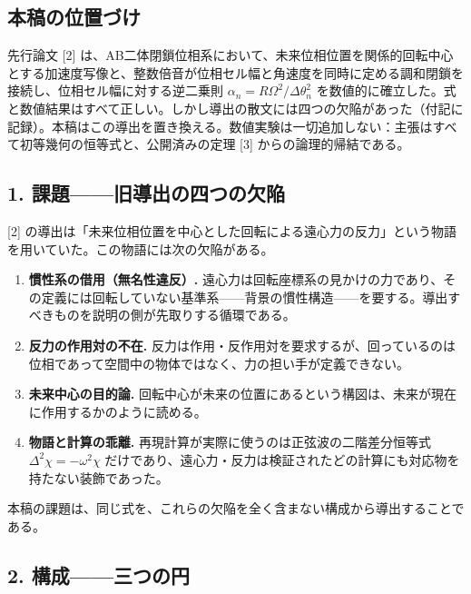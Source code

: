 \documentclass[
  a4paper,
]{ltjsarticle}
\providecommand{\tightlist}{%
  \setlength{\itemsep}{0pt}\setlength{\parskip}{0pt}}
\begin{document}
\subsection{本稿の位置づけ}\label{ux672cux7a3fux306eux4f4dux7f6eux3065ux3051}

先行論文 {[}2{]}
は、AB二体閉鎖位相系において、未来位相位置を関係的回転中心とする加速度写像と、整数倍音が位相セル幅と角速度を同時に定める調和閉鎖を接続し、位相セル幅に対する逆二乗則
\(\alpha_n=R\Omega^2/\Delta\theta_n^2\)
を数値的に確立した。式と数値結果はすべて正しい。しかし導出の散文には四つの欠陥があった（付記に記録）。本稿はこの導出を置き換える。数値実験は一切追加しない：主張はすべて初等幾何の恒等式と、公開済みの定理
{[}3{]} からの論理的帰結である。

\subsection{1.
課題------旧導出の四つの欠陥}\label{ux8ab2ux984cux65e7ux5c0eux51faux306eux56dbux3064ux306eux6b20ux9665}

{[}2{]}
の導出は「未来位相位置を中心とした回転による遠心力の反力」という物語を用いていた。この物語には次の欠陥がある。

\begin{enumerate}
\def\labelenumi{\arabic{enumi}.}
\tightlist
\item
  \textbf{慣性系の借用（無名性違反）.}
  遠心力は回転座標系の見かけの力であり、その定義には回転していない基準系------背景の慣性構造------を要する。導出すべきものを説明の側が先取りする循環である。
\item
  \textbf{反力の作用対の不在.}
  反力は作用・反作用対を要求するが、回っているのは位相であって空間中の物体ではなく、力の担い手が定義できない。
\item
  \textbf{未来中心の目的論.}
  回転中心が未来の位置にあるという構図は、未来が現在に作用するかのように読める。
\item
  \textbf{物語と計算の乖離.}
  再現計算が実際に使うのは正弦波の二階差分恒等式
  \(\Delta^2\chi=-\omega^2\chi\)
  だけであり、遠心力・反力は検証されたどの計算にも対応物を持たない装飾であった。
\end{enumerate}

本稿の課題は、同じ式を、これらの欠陥を全く含まない構成から導出することである。

\subsection{2.
構成------三つの円}\label{ux69cbux6210ux4e09ux3064ux306eux5186}
\end{document}
